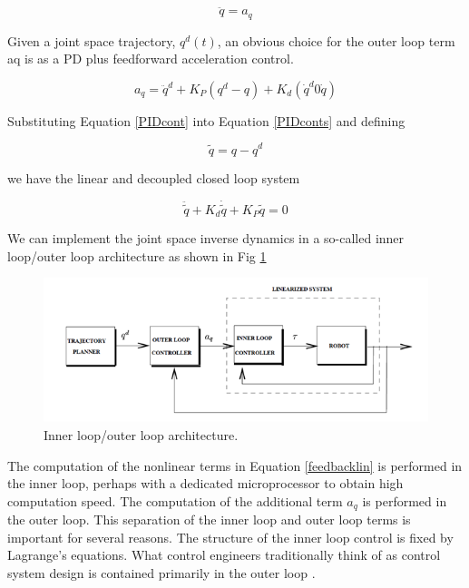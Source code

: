 \documentclass{UoNMCHA}
\numberwithin{equation}{section}
\begin{document}
	\begin{equation}\label{PIDconts}
	\ddot{q} = a_{q}
	\end{equation}
	
	Given a joint space trajectory, $q^d (t)$, an obvious choice for the outer loop term aq is as a PD plus feedforward acceleration control.  
	
	\begin{equation}\label{PIDcont}
	a_{q} = \ddot{q}^d + K_P (q^d - q) + K_d (\dot{q}^d 0 \dot{q})
	\end{equation}
	
	Substituting Equation \ref{PIDcont} into Equation \ref{PIDconts} and defining
	
	\begin{equation}\label{PIDconts}
	\tilde{q} = q - q^d
	\end{equation}
	
	we have the linear and decoupled closed loop system
	
	\begin{equation}
	\ddot{\tilde{q}} + K_d \dot{\tilde{q}} + K_P \tilde{q} = 0
	\end{equation}
	
	We can implement the joint space inverse dynamics in a so-called inner loop/outer loop architecture as shown in Fig \ref{figs/Picture3}
	
	\begin{figure}[H]
		\begin{center}
			\includegraphics[width=1\linewidth]{figs/Picture3}
			\caption{Inner loop/outer loop architecture. \cite{levine_1996_the}}
			\label{figs/Picture3}
		\end{center}
	\end{figure}
	
	The computation of the nonlinear terms in Equation \ref{feedbacklin} is performed in the inner loop, perhaps with a dedicated microprocessor to obtain high computation speed. The computation of the additional term $a_q$ is performed in the outer loop. This separation of the inner loop and outer loop terms is important for several reasons. The structure of the inner loop control is fixed by Lagrange's equations. What control engineers traditionally think of as control system design is contained primarily in the outer loop \cite{levine_1996_the}. 
	
\end{document}
